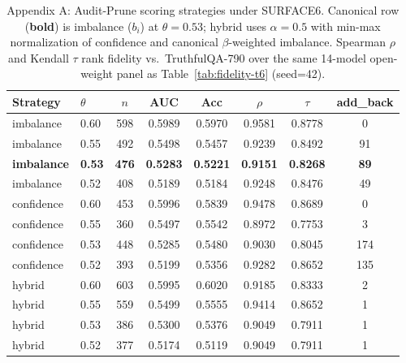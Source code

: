 \begin{table}[t]
\centering
\small
\caption{Appendix A: Audit-Prune scoring strategies under SURFACE6. Canonical row (\textbf{bold}) is imbalance ($b_i$) at $\theta=0.53$; hybrid uses $\alpha=0.5$ with min-max normalization of confidence and canonical $\beta$-weighted imbalance. Spearman $\rho$ and Kendall $\tau$ rank fidelity vs.\ TruthfulQA-790 over the same 14-model open-weight panel as Table~\ref{tab:fidelity-t6} (seed=42).}
\label{tab:appendix-a-surface6}
\begin{tabular}{llcccccc}
\toprule
Strategy & $\theta$ & $n$ & AUC & Acc & $\rho$ & $\tau$ & add\_back \\
\midrule
imbalance & 0.60 & 598 & 0.5989 & 0.5970 & 0.9581 & 0.8778 & 0 \\
imbalance & 0.55 & 492 & 0.5498 & 0.5457 & 0.9239 & 0.8492 & 91 \\
\textbf{imbalance } & \textbf{ 0.53 } & \textbf{ 476 } & \textbf{ 0.5283 } & \textbf{ 0.5221 } & \textbf{ 0.9151 } & \textbf{ 0.8268 } & \textbf{ 89} \\
imbalance & 0.52 & 408 & 0.5189 & 0.5184 & 0.9248 & 0.8476 & 49 \\
confidence & 0.60 & 453 & 0.5996 & 0.5839 & 0.9478 & 0.8689 & 0 \\
confidence & 0.55 & 360 & 0.5497 & 0.5542 & 0.8972 & 0.7753 & 3 \\
confidence & 0.53 & 448 & 0.5285 & 0.5480 & 0.9030 & 0.8045 & 174 \\
confidence & 0.52 & 393 & 0.5199 & 0.5356 & 0.9282 & 0.8652 & 135 \\
hybrid & 0.60 & 603 & 0.5995 & 0.6020 & 0.9185 & 0.8333 & 2 \\
hybrid & 0.55 & 559 & 0.5499 & 0.5555 & 0.9414 & 0.8652 & 1 \\
hybrid & 0.53 & 386 & 0.5300 & 0.5376 & 0.9049 & 0.7911 & 1 \\
hybrid & 0.52 & 377 & 0.5174 & 0.5119 & 0.9049 & 0.7911 & 1 \\
\bottomrule
\end{tabular}
\end{table}
